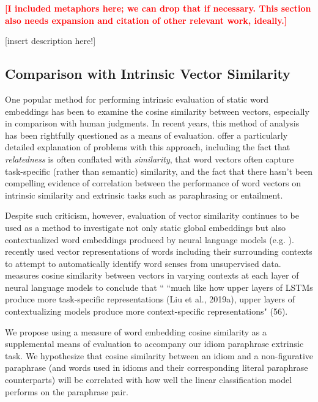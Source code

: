 \documentclass[11pt,a4paper]{article}
\newcommand{\comment}[1]{\textcolor{red}{\bf \small [#1]}}
\begin{document}
\comment{I included metaphors here; we can drop that if necessary. This section also needs expansion and citation of other relevant work, ideally.}

\vspace{5mm}
[insert description here!]

\vspace{15mm}



\subsection{Comparison with Intrinsic Vector Similarity}

One popular method for performing intrinsic evaluation of static word embeddings has been to examine the cosine similarity between vectors, especially in comparison with human judgments. In recent years, this method of analysis has been rightfully questioned as a means of evaluation. \citet{faruqui-etal-2016-problems} offer a particularly detailed explanation of problems with this approach, including the fact that \textit{relatedness} is often conflated with \textit{similarity}, that word vectors often capture task-specific (rather than semantic) similarity, and the fact that there hasn't been compelling evidence of correlation between the performance of word vectors on intrinsic similarity and extrinsic tasks such as paraphrasing or entailment.

Despite such criticism, however, evaluation of vector similarity continues to be used as a method to investigate not only static global embeddings but also contextualized word embeddings produced by neural language models (e.g. \citet{van_Aken_2019}). \citet{huang_cho_bowman_2020} recently used vector representations of words including their surrounding contexts to attempt to automatically identify word senses from unsupervised data. \citep{ethayarajh2019contextual} measures cosine similarity between vectors in varying contexts at each layer of neural language models to conclude that `` ``much like how upper layers of LSTMs produce more task-specific
representations (Liu et al., 2019a), upper layers of contextualizing models produce more context-specific representations" (56).

 We propose using a measure of word embedding cosine similarity as a supplemental means of evaluation to accompany our idiom paraphrase extrinsic task. We hypothesize that cosine similarity between an idiom and a non-figurative paraphrase (and words used in idioms and their corresponding literal paraphrase counterparts) will be correlated with how well the linear classification model performs on the paraphrase pair.
 
\end{document}
